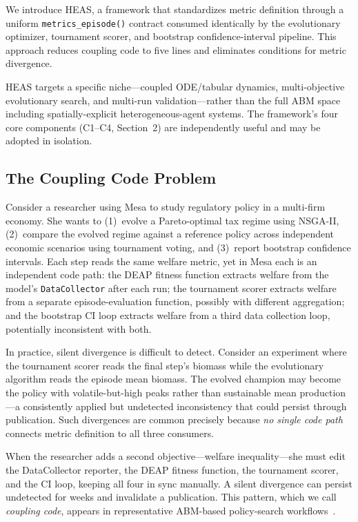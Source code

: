 \documentclass{wscpaperproc}
\begin{document}
We introduce HEAS, a framework that standardizes metric definition through a
uniform \texttt{metrics\_episode()} contract consumed identically by the
evolutionary optimizer, tournament scorer, and bootstrap confidence-interval
pipeline. This approach reduces coupling code to five lines and eliminates
conditions for metric divergence.

HEAS targets a specific niche---coupled ODE/tabular dynamics, multi-objective
evolutionary search, and multi-run validation---rather than the full ABM space
including spatially-explicit heterogeneous-agent systems. The framework's four
core components (C1--C4, Section~2) are independently useful and may be adopted
in isolation.

\subsection{The Coupling Code Problem}

Consider a researcher using Mesa to study regulatory policy in a multi-firm
economy. She wants to (1)~evolve a Pareto-optimal tax regime using NSGA-II,
(2)~compare the evolved regime against a reference policy across independent
economic scenarios using tournament voting, and (3)~report bootstrap confidence
intervals. Each step reads the same welfare metric, yet in Mesa each is an
independent code path: the DEAP fitness function extracts welfare from the
model's \texttt{DataCollector} after each run; the tournament scorer extracts
welfare from a separate episode-evaluation function, possibly with different
aggregation; and the bootstrap CI loop extracts welfare from a third data
collection loop, potentially inconsistent with both.

In practice, silent divergence is difficult to detect. Consider an experiment
where the tournament scorer reads the final step's biomass while the
evolutionary algorithm reads the episode mean biomass. The evolved champion may
become the policy with volatile-but-high peaks rather than sustainable mean
production---a consistently applied but undetected inconsistency that could
persist through publication. Such divergences are common precisely because
\emph{no single code path} connects metric definition to all three consumers.

When the researcher adds a second objective---welfare inequality---she must edit
the DataCollector reporter, the DEAP fitness function, the tournament scorer, and
the CI loop, keeping all four in sync manually. A silent divergence can persist
undetected for weeks and invalidate a publication. This pattern, which we call
\emph{coupling code}, appears in representative ABM-based policy-search
workflows~\cite{pangallo2019best,capri2023transport}.
\end{document}
